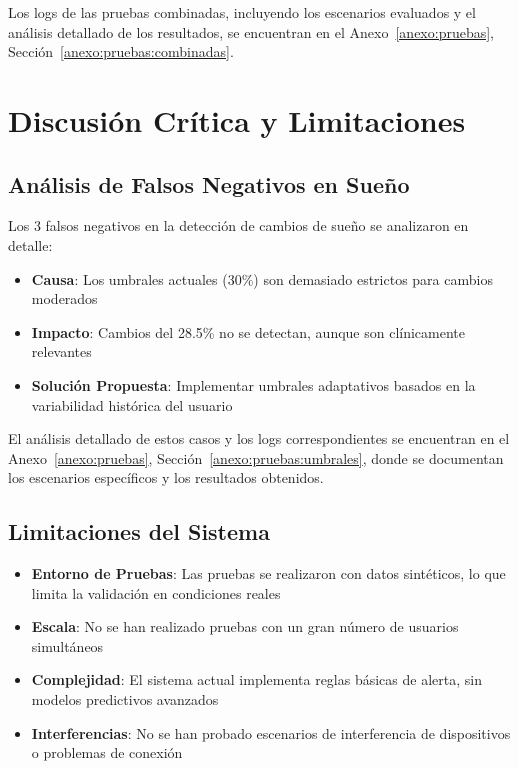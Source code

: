 Los logs de las pruebas combinadas, incluyendo los escenarios evaluados y el análisis detallado de los resultados, se encuentran en el Anexo~\ref{anexo:pruebas}, Sección~\ref{anexo:pruebas:combinadas}.

\section{Discusión Crítica y Limitaciones}

\subsection{Análisis de Falsos Negativos en Sueño}
Los 3 falsos negativos en la detección de cambios de sueño se analizaron en detalle:
\begin{itemize}
    \item \textbf{Causa}: Los umbrales actuales (30\%) son demasiado estrictos para cambios moderados
    \item \textbf{Impacto}: Cambios del 28.5\% no se detectan, aunque son clínicamente relevantes
    \item \textbf{Solución Propuesta}: Implementar umbrales adaptativos basados en la variabilidad histórica del usuario
\end{itemize}

El análisis detallado de estos casos y los logs correspondientes se encuentran en el Anexo~\ref{anexo:pruebas}, Sección~\ref{anexo:pruebas:umbrales}, donde se documentan los escenarios específicos y los resultados obtenidos.

\subsection{Limitaciones del Sistema}
\begin{itemize}
    \item \textbf{Entorno de Pruebas}: Las pruebas se realizaron con datos sintéticos, lo que limita la validación en condiciones reales
    \item \textbf{Escala}: No se han realizado pruebas con un gran número de usuarios simultáneos
    \item \textbf{Complejidad}: El sistema actual implementa reglas básicas de alerta, sin modelos predictivos avanzados
    \item \textbf{Interferencias}: No se han probado escenarios de interferencia de dispositivos o problemas de conexión
\end{itemize}

